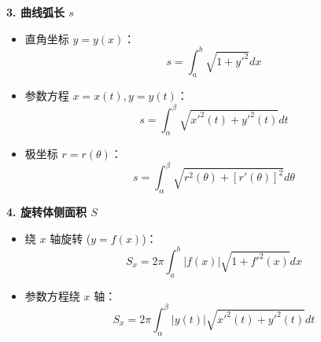 \documentclass[a4paper,12pt]{ctexart}
\begin{document}
\textbf{3. 曲线弧长 $s$}
\begin{itemize}
    \item 直角坐标 $y=y(x)$：
    \[ s = \int_a^b \sqrt{1+y'^2} dx \]
    \item 参数方程 $x=x(t), y=y(t)$：
    \[ s = \int_\alpha^\beta \sqrt{x'^2(t)+y'^2(t)} dt \]
    \item 极坐标 $r=r(\theta)$：
    \[ s = \int_\alpha^\beta \sqrt{r^2(\theta) + [r'(\theta)]^2} d\theta \]
\end{itemize}

\textbf{4. 旋转体侧面积 $S$}
\begin{itemize}
    \item 绕 $x$ 轴旋转 ($y=f(x)$)：
    \[ S_x = 2\pi \int_a^b |f(x)| \sqrt{1+f'^2(x)} dx \]
    \item 参数方程绕 $x$ 轴：
    \[ S_x = 2\pi \int_\alpha^\beta |y(t)| \sqrt{x'^2(t)+y'^2(t)} dt \]
\end{itemize}
\end{document}
